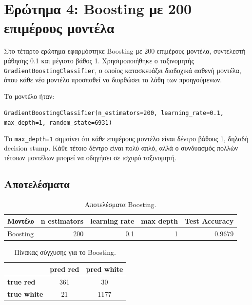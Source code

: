\documentclass[12pt,a4paper]{article}
\newcommand{\code}[1]{\texttt{\textenglish{#1}}}
\begin{document}
\section{Ερώτημα 4: Boosting με 200 επιμέρους μοντέλα}

Στο τέταρτο ερώτημα εφαρμόστηκε Boosting με 200 επιμέρους μοντέλα,
συντελεστή μάθησης 0.1 και μέγιστο βάθος 1. Χρησιμοποιήθηκε ο ταξινομητής
\code{GradientBoostingClassifier}, ο οποίος κατασκευάζει διαδοχικά ασθενή
μοντέλα, όπου κάθε νέο μοντέλο προσπαθεί να διορθώσει τα λάθη των προηγούμενων.

Το μοντέλο ήταν:

\begin{center}
\small
\code{GradientBoostingClassifier(n\_estimators=200, learning\_rate=0.1, max\_depth=1, random\_state=6931)}
\end{center}

Το \code{max\_depth=1} σημαίνει ότι κάθε επιμέρους μοντέλο είναι δέντρο
βάθους 1, δηλαδή decision stump. Κάθε τέτοιο δέντρο είναι πολύ απλό, αλλά ο
συνδυασμός πολλών τέτοιων μοντέλων μπορεί να οδηγήσει σε ισχυρό ταξινομητή.

\subsection{Αποτελέσματα}

\begin{table}[H]
\centering
\caption{Αποτελέσματα Boosting.}
\begin{tabular}{lrrrr}
\toprule
\textbf{Μοντέλο} & \textbf{n estimators} & \textbf{learning rate} & \textbf{max depth} & \textbf{Test Accuracy} \\
\midrule
Boosting & 200 & 0.1 & 1 & 0.9679 \\
\bottomrule
\end{tabular}
\end{table}

\begin{table}[H]
\centering
\caption{Πίνακας σύγχυσης για το Boosting.}
\begin{tabular}{lcc}
\toprule
& \textbf{pred red} & \textbf{pred white} \\
\midrule
\textbf{true red}   & 361 & 30 \\
\textbf{true white} & 21  & 1177 \\
\bottomrule
\end{tabular}
\end{table}
\end{document}
